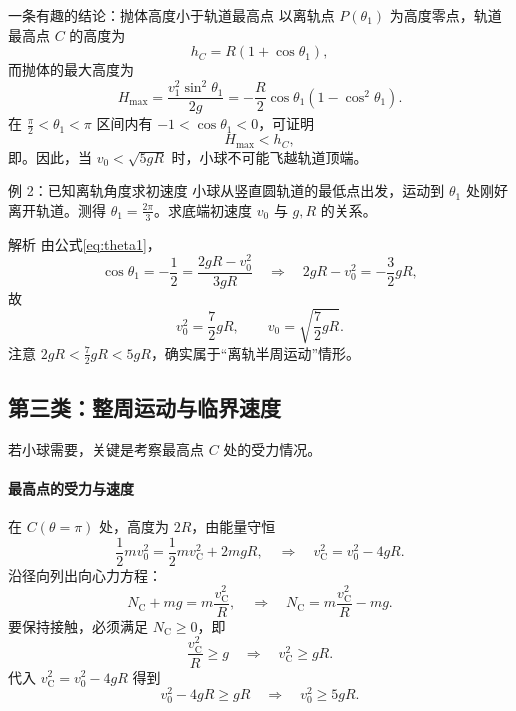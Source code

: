 \documentclass[a4paper,11pt]{ctexart}
\begin{document}
\begin{summarybox}{一条有趣的结论：抛体高度小于轨道最高点}
  以离轨点 $P(\theta_1)$ 为高度零点，轨道最高点 $C$ 的高度为
  \[
    h_{C} = R(1+\cos\theta_1),
  \]
  而抛体的最大高度为
  \[
    H_{\max} = \frac{v_1^2\sin^2\theta_1}{2g}
             = -\frac{R}{2}\cos\theta_1(1-\cos^2\theta_1).
  \]
  在 $\tfrac{\pi}{2}<\theta_1<\pi$ 区间内有 $-1<\cos\theta_1<0$，可证明
  \[
    H_{\max} < h_{C},
  \]
  即。因此，当 $v_0<\sqrt{5gR}$ 时，小球不可能飞越轨道顶端。
\end{summarybox}

\begin{examplebox}{例 2：已知离轨角度求初速度}
  小球从竖直圆轨道的最低点出发，运动到 $\theta_1$ 处刚好离开轨道。测得 $\theta_1 = \frac{2\pi}{3}$。求底端初速度 $v_0$ 与 $g,R$ 的关系。
\end{examplebox}

\begin{proofbox}{解析}
  由公式\eqref{eq:theta1}，
  \[
    \cos\theta_1 = -\frac{1}{2}
    = \frac{2gR - v_0^2}{3gR}
    \quad\Rightarrow\quad
    2gR - v_0^2 = -\frac{3}{2}gR,
  \]
  故
  \[
    v_0^2 = \frac{7}{2}gR,
    \qquad
    v_0 = \sqrt{\frac{7}{2}gR}.
  \]
  注意 $2gR < \frac{7}{2}gR < 5gR$，确实属于“离轨半周运动”情形。
\end{proofbox}

\subsection{第三类：整周运动与临界速度}


若小球需要，关键是考察最高点 $C$ 处的受力情况。

\paragraph*{最高点的受力与速度}
在 $C(\theta=\pi)$ 处，高度为 $2R$，由能量守恒
\[
  \frac12 m v_0^2 = \frac12 m v_{\mathrm{C}}^2 + 2mgR,
  \quad\Rightarrow\quad
  v_{\mathrm{C}}^2 = v_0^2 - 4gR.
\]
沿径向列出向心力方程：
\[
  N_{\mathrm{C}} + mg = m\frac{v_{\mathrm{C}}^2}{R},
  \quad\Rightarrow\quad
  N_{\mathrm{C}} = m\frac{v_{\mathrm{C}}^2}{R} - mg.
\]
要保持接触，必须满足 $N_{\mathrm{C}}\ge 0$，即
\[
  \frac{v_{\mathrm{C}}^2}{R} \ge g
  \quad\Longrightarrow\quad
  v_{\mathrm{C}}^2 \ge gR.
\]
代入 $v_{\mathrm{C}}^2 = v_0^2 - 4gR$ 得到
\[
  v_0^2 - 4gR \ge gR
  \quad\Rightarrow\quad
  v_0^2 \ge 5gR.
\]
\end{document}
